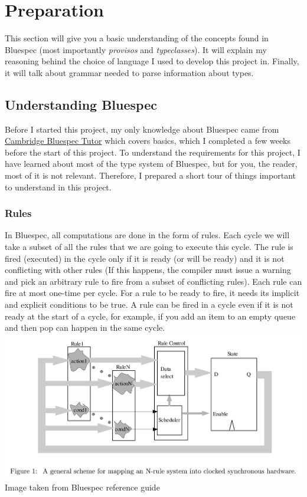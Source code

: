 \documentclass[12pt]{report}
\begin{document}
\chapter{Preparation}
This section will give you a basic understanding of the concepts found in Bluespec (most importantly \emph{provisos} and \emph{typeclasses}). It will explain my reasoning behind the choice of language I used to develop this project in. Finally, it will talk about grammar needed to parse information about types.
\section{Understanding Bluespec}
Before I started this project, my only knowledge about Bluespec came from \href{https://www-bluespec.cl.cam.ac.uk/}{Cambridge Bluespec Tutor}\cite{CambridgeBluespecTutor} which covers basics, which I completed a few weeks before the start of this project. To understand the requirements for this project, I have learned about most of the type system of Bluespec, but for you, the reader, most of it is not relevant. Therefore, I prepared a short tour of things important to understand in this project. 
\subsection{Rules}
In Bluespec, all computations are done in the form of rules.  
Each cycle we will take a subset of all the rules that we are going to execute this cycle. The rule is fired (executed) in the cycle only if it is ready (or will be ready) and it is not conflicting with other rules (If this happens, the compiler must issue a warning and pick an arbitrary rule to fire from a subset of conflicting rules). Each rule can fire at most one-time per cycle.  
For a rule to be ready to fire, it needs its implicit and explicit conditions to be true.  
A rule can be fired in a cycle even if it is not ready at the start of a cycle, for example, if you add an item to an empty queue and then pop can happen in the same cycle. \\ 
\includegraphics[width=\textwidth]{Rulemapping.png} 
Image taken from Bluespec reference guide \cite{BscReference} 
\end{document}

